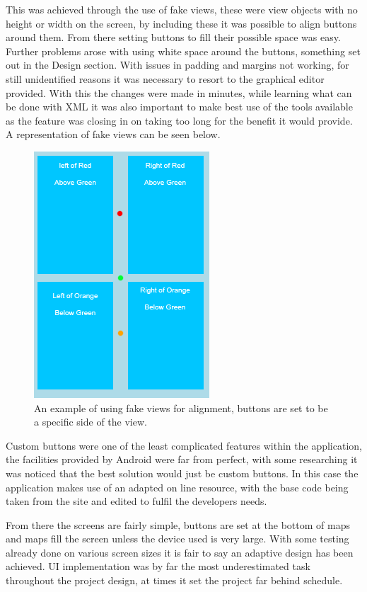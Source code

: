This was achieved through the use of fake views, these were view objects with no height or width on the screen, by including these it was possible to align buttons around them. From there setting buttons to fill their possible space was easy. Further problems arose with using white space around the buttons, something set out in the Design section. With issues in padding and margins not working, for still unidentified reasons it was necessary to resort to the graphical editor provided. With this the changes were made in minutes, while learning what can be done with  XML it was also important to make best use of the tools available as the feature was closing in on taking too long for the benefit it would provide. A representation of fake views can be seen below. 
\begin{figure}[H]
\includegraphics[scale=0.8]{Chapter3/fakeview.png}
\caption[FakeView Example]{An example of using fake views for alignment, buttons are set to be a specific side of the view.}
\end{figure}
Custom buttons were one of the least complicated features within the application, the facilities provided by Android were far from perfect, with some researching it was noticed that the best solution would just be custom buttons. In this case the application makes use of an adapted on line resource\cite{button}, with the base code being taken from the site and edited to fulfil the developers needs. 

From there the screens are fairly simple, buttons are set at the bottom of maps and maps fill the screen unless the device used is very large. With some testing already done on various screen sizes it is fair to say an adaptive design has been achieved. UI implementation was by far the most underestimated task throughout the project design, at times it set the project far behind schedule. 
